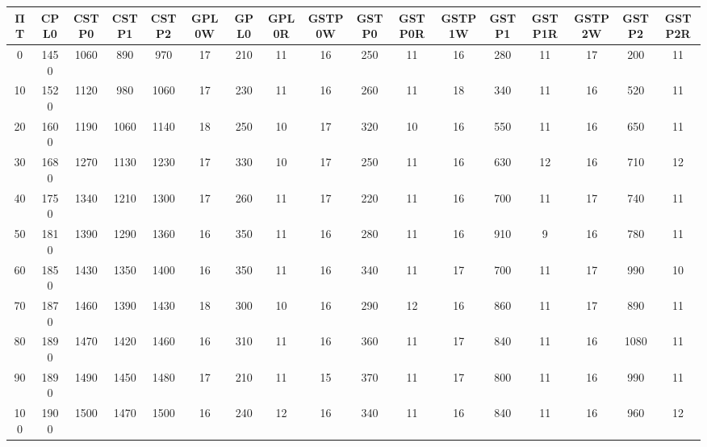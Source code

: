 \begin{tabular}{|c|c|c|c|c|c|c|c|c|c|c|c|c|c|c|c|c|}
\hline
ΠΤ&CPL0&CSTP0&CSTP1&CSTP2&GPL0W&GPL0&GPL0R&GSTP0W&GSTP0&GSTP0R&GSTP1W&GSTP1&GSTP1R&GSTP2W&GSTP2&GSTP2R\\\hline
\hline
0&1450&1060&890&970&17&210&11&16&250&11&16&280&11&17&200&11\\
\hline
10&1520&1120&980&1060&17&230&11&16&260&11&18&340&11&16&520&11\\
\hline
20&1600&1190&1060&1140&18&250&10&17&320&10&16&550&11&16&650&11\\
\hline
30&1680&1270&1130&1230&17&330&10&17&250&11&16&630&12&16&710&12\\
\hline
40&1750&1340&1210&1300&17&260&11&17&220&11&16&700&11&17&740&11\\
\hline
50&1810&1390&1290&1360&16&350&11&16&280&11&16&910&9&16&780&11\\
\hline
60&1850&1430&1350&1400&16&350&11&16&340&11&17&700&11&17&990&10\\
\hline
70&1870&1460&1390&1430&18&300&10&16&290&12&16&860&11&17&890&11\\
\hline
80&1890&1470&1420&1460&16&310&11&16&360&11&17&840&11&16&1080&11\\
\hline
90&1890&1490&1450&1480&17&210&11&15&370&11&17&800&11&16&990&11\\
\hline
100&1900&1500&1470&1500&16&240&12&16&340&11&16&840&11&16&960&12\\
\hline
\end{tabular}
